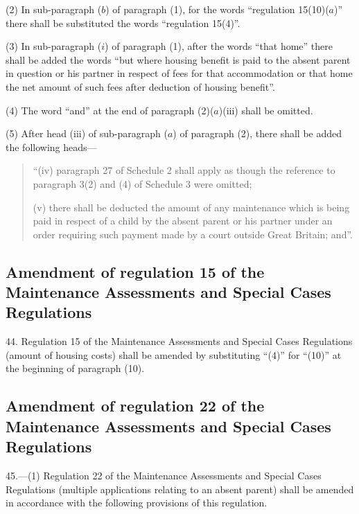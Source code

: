 \documentclass[12pt,a4paper]{article}
\begin{document}
\begin{sloppypar}
(2) In sub-paragraph ($b$) of paragraph (1), for the words “regulation 15(10)($a$)” there shall be substituted the words “regulation 15(4)”.
\end{sloppypar}

(3) In sub-paragraph ($i$) of paragraph (1), after the words “that home” there shall be added the words “but where housing benefit is paid to the absent parent in question or his partner in respect of fees for that accommodation or that home the net amount of such fees after deduction of housing benefit”.

(4) The word “and” at the end of paragraph (2)($a$)(iii) shall be omitted.

(5) After head (iii) of sub-paragraph ($a$) of paragraph (2), there shall be added the following heads—
\begin{quotation}
“(iv) paragraph 27 of Schedule 2 shall apply as though the reference to paragraph 3(2) and (4) of Schedule 3 were omitted;

(v) there shall be deducted the amount of any maintenance which is being paid in respect of a child by the absent parent or his partner under an order requiring such payment made by a court outside Great Britain; and”.
\end{quotation}

\subsection[44. Amendment of regulation 15 of the Maintenance Assessments and Special Cases Regulations]{Amendment of regulation 15 of the Maintenance Assessments and Special Cases Regulations}

44.  Regulation 15 of the Maintenance Assessments and Special Cases Regulations (amount of housing costs) shall be amended by substituting “(4)” for “(10)” at the beginning of paragraph (10).

\subsection[45. Amendment of regulation 22 of the Maintenance Assessments and Special Cases Regulations]{Amendment of regulation 22 of the Maintenance Assessments and Special Cases Regulations}

45.—(1) Regulation 22 of the Maintenance Assessments and Special Cases Regulations (multiple applications relating to an absent parent) shall be amended in accordance with the following provisions of this regulation.
\end{document}

